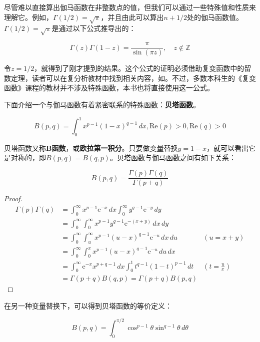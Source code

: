 尽管难以直接算出伽马函数在非整数点的值，但我们可以通过一些特殊值和性质来理解它。例如，$\Gamma(1/2)=\sqrt{\pi}$，并且由此可以算出$n+1/2$处的伽马函数值。$\Gamma(1/2)=\sqrt{\pi}$是通过以下公式推导出的：
\begin{claim}[余元公式]
    \[\Gamma (z)\Gamma (1-z)=\frac{\pi}{\sin(\pi z)},\quad z\notin \mathbb{Z}\]
\end{claim}

令$z=1/2$，就得到了刚才提到的结果。这个公式的证明必须借助复变函数中的留数定理，读者可以在复分析教材中找到相关内容，如\cite{Function_Theory}。不过，多数本科生的《复变函数》课程的教材并不涉及特殊函数，本书也将直接使用这一公式。

下面介绍一个与伽马函数有着紧密联系的特殊函数：\textbf{贝塔函数}。

\begin{definition}[贝塔函数]
    \[B(p,q)=\int_{0}^{1}x^{p-1}(1-x)^{q-1}\,dx,\text{Re}(p)>0,\text{Re}(q)>0\]
\end{definition}
贝塔函数又称\textbf{B函数}，或\textbf{欧拉第一积分}。只要做变量替换$y=1-x$，就可以看出它是对称的，即$B(p,q)=B(q,p)$。贝塔函数与伽马函数之间有如下关系：
\begin{theorem}
    \[B(p,q)=\frac{\Gamma (p)\Gamma (q)}{\Gamma (p+q)}\]
\end{theorem}
\begin{proof}
    \begin{align*}
    \Gamma (p)\Gamma (q)&=\int_{0}^{\infty}x^{p-1}\mathrm{e}^{-x}\,dx\int_{0}^{\infty}y^{q-1}\mathrm{e}^{-y}\,dy\\
    &=\int_{0}^{\infty}\int_{0}^{\infty}x^{p-1}y^{q-1}\mathrm{e}^{-(x+y)}\,dx\,dy\\
    &=\int_{0}^{\infty}\int_{u}^{\infty}x^{p-1}(u-x)^{q-1}\mathrm{e}^{-u}\,dx\,du&(u=x+y)\\
    &=\int_{0}^{\infty}\int_{0}^{x}x^{p-1}(u-x)^{q-1}\mathrm{e}^{-u}\,du\,dx\\
    &=\int_{0}^{\infty}\mathrm{e}^{-x}x^{p+q-1}\,dx\int_{0}^{1}t^{q-1}(1-t)^{p-1}\,dt&\left(t=\frac{u}{x}\right)\\
    &=\Gamma (p+q)B(q,p)=\Gamma (p+q)B(p,q)
    \end{align*}
\end{proof}

在另一种变量替换下，可以得到贝塔函数的等价定义：
\begin{definition}[贝塔函数的等价定义]
    \[B(p,q)=\int_{0}^{\pi/2}\cos^{p-1}\theta\sin^{q-1}\theta\,d\theta\]
\end{definition}

